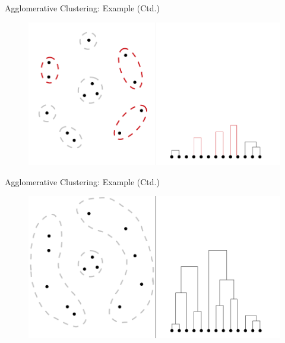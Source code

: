 \begin{frame}{Agglomerative Clustering: Example (Ctd.)}{}
	\begin{figure}
		\centering
		\includegraphics[scale=0.4]{12_clustering/02_img/aggl_clust_4}
	\end{figure}
\end{frame}


\begin{frame}{Agglomerative Clustering: Example (Ctd.)}{}
	\begin{figure}
		\centering
		\includegraphics[scale=0.4]{12_clustering/02_img/aggl_clust_5}
	\end{figure}
\end{frame}


